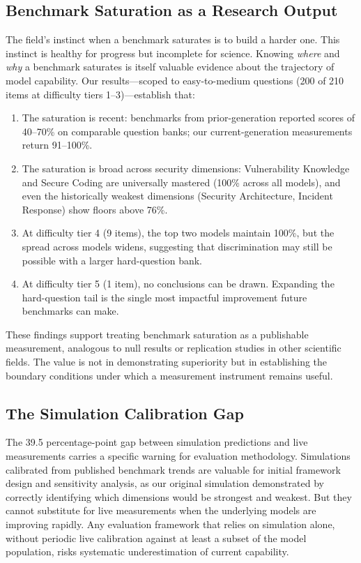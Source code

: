 \documentclass[journal]{IEEEtran}
\begin{document}
\subsection{Benchmark Saturation as a Research Output}

The field's instinct when a benchmark saturates is to build a harder one. This instinct is healthy for progress but incomplete for science. Knowing \emph{where} and \emph{why} a benchmark saturates is itself valuable evidence about the trajectory of model capability. Our results---scoped to easy-to-medium questions (200 of 210 items at difficulty tiers 1--3)---establish that:

\begin{enumerate}[leftmargin=*]
    \item The saturation is recent: benchmarks from prior-generation reported scores of 40--70\% on comparable question banks; our current-generation measurements return 91--100\%.
    \item The saturation is broad across security dimensions: Vulnerability Knowledge and Secure Coding are universally mastered (100\% across all models), and even the historically weakest dimensions (Security Architecture, Incident Response) show floors above 76\%.
    \item At difficulty tier 4 (9 items), the top two models maintain 100\%, but the spread across models widens, suggesting that discrimination may still be possible with a larger hard-question bank.
    \item At difficulty tier 5 (1 item), no conclusions can be drawn. Expanding the hard-question tail is the single most impactful improvement future benchmarks can make.
\end{enumerate}

These findings support treating benchmark saturation as a publishable measurement, analogous to null results or replication studies in other scientific fields. The value is not in demonstrating superiority but in establishing the boundary conditions under which a measurement instrument remains useful.

\subsection{The Simulation Calibration Gap}

The 39.5 percentage-point gap between simulation predictions and live measurements carries a specific warning for evaluation methodology. Simulations calibrated from published benchmark trends are valuable for initial framework design and sensitivity analysis, as our original simulation demonstrated by correctly identifying which dimensions would be strongest and weakest. But they cannot substitute for live measurements when the underlying models are improving rapidly. Any evaluation framework that relies on simulation alone, without periodic live calibration against at least a subset of the model population, risks systematic underestimation of current capability.
\end{document}
